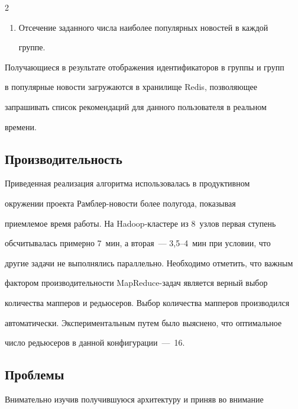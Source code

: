 \begin{multicols}{2}
\begin{enumerate}[1.]
\item Отсечение заданного числа наиболее популярных новостей в каж\-дой 


группе.


\end{enumerate}





   Получающиеся в результате отображения идентификаторов в группы и групп 


в популярные ново\-сти загружаются в хранилище Redis, поз\-во\-ля\-ющее 


запрашивать список рекомендаций для данного пользователя в реальном 


времени.





\subsection{Производительность}





   Приведенная реализация алгоритма использовалась в продуктивном 


окружении проекта Рамб\-лер-но\-во\-сти более полугода, показывая 


приемлемое время работы. На Hadoop-клас\-те\-ре из 8~узлов первая ступень 


обсчитывалась примерно 7~мин, а вторая~--- 3,5--4~мин при условии, что 


другие задачи не выполнялись параллельно. Необходимо отметить, что важным 


фактором производительности MapReduce-за\-дач является верный выбор 


количества мапперов и редьюсеров. Выбор количества мапперов производился 


автоматически. Экспериментальным путем было выяснено, что оптимальное 


число редьюсеров в данной конфигурации~---~16.





\subsection{Проблемы}





   Внимательно изучив получившуюся архитектуру и приняв во внимание 



\end{multicols}
